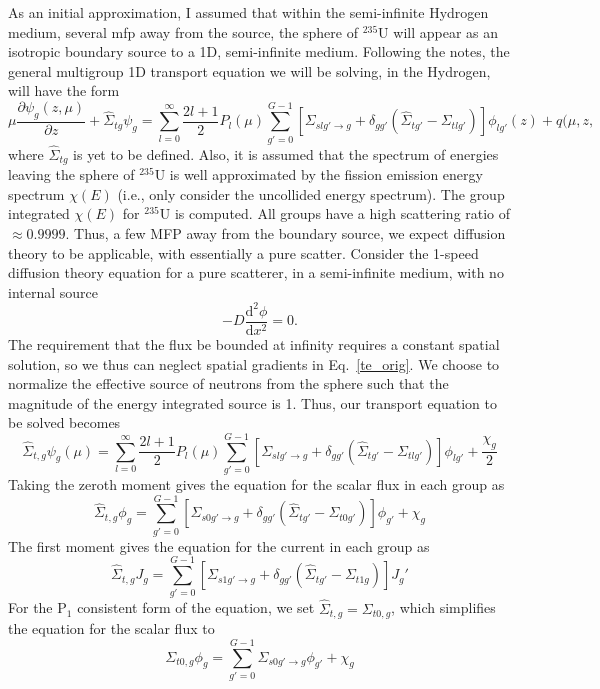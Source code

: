 \documentclass[12pt]{article}
\newcommand{\pderiv}[2]{\frac{\partial #1}{\partial #2}}
\renewcommand{\d}{\mathrm{d}}
\newcommand{\ra}{\rightarrow}
\newenvironment{solnum}[2][Solution]{\begin{trivlist}
\item[\hskip \labelsep {\bfseries #1}\hskip \labelsep {\bfseries #2:}]\hspace{0.3in}\newline\newline}{\end{trivlist}}
\newcommand{\iso}[2]{\ensuremath{^{#2}\text{#1}}}
\begin{document}
\begin{solnum}{2}
As an initial approximation, I assumed that within the semi-infinite Hydrogen medium, several
mfp away from the source, the sphere of \iso{U}{235} will appear as an isotropic
boundary source to a 1D, semi-infinite medium.  Following the notes, the general multigroup
1D transport equation we will be solving, in the Hydrogen, will have the form
\begin{equation}\label{te_orig}
    \mu\pderiv{\psi_g(z,\mu)}{z} +\hat\Sigma_{tg}\psi_g = \sum_{l=0}^\infty
    \frac{2l+1}{2} P_l(\mu) \sum_{g'=0}^{G-1}\left[\Sigma_{slg'\ra g} +
    \delta_{gg'}\left(\hat\Sigma_{tg'}-\Sigma_{tlg'}\right)\right]\phi_{lg'}(z) +
    q(\mu,z,
\end{equation}
where $\hat\Sigma_{tg}$ is yet to be defined.
Also, it is assumed that the spectrum of energies leaving the sphere of \iso{U}{235} is well
approximated by the fission emission energy spectrum $\chi(E)$ (i.e., only consider the
uncollided energy spectrum).  The group integrated $\chi(E)$ for \iso{U}{235} is
computed.  All groups have a high scattering ratio of $\approx0.9999$.  Thus, a
few MFP away from the boundary source, we expect diffusion theory to be applicable,
with essentially a pure scatter. Consider the 1-speed diffusion theory equation for a pure
scatterer, in a semi-infinite medium, with no internal source
\begin{equation}
    -D \frac{\d^2\phi}{\d x^2} = 0.
\end{equation}
The requirement that the flux be bounded at infinity requires a constant spatial
solution, so we thus can neglect spatial gradients in Eq.~\eqref{te_orig}.
We choose to normalize the effective source of neutrons from the sphere such that the
magnitude of the energy integrated source is 1.  Thus, our transport equation to be solved becomes
\begin{equation}
    \hat\Sigma_{t,g}\psi_g(\mu) = \sum_{l=0}^\infty
    \frac{2l+1}{2} P_l(\mu) \sum_{g'=0}^{G-1}\left[\Sigma_{slg'\ra g} +
    \delta_{gg'}\left(\hat\Sigma_{tg'}-\Sigma_{tlg'}\right)\right]\phi_{lg'} +
    \frac{\chi_g}{2}
\end{equation}
Taking the zeroth moment gives the equation for the scalar flux in each group as
\begin{equation}
    \hat\Sigma_{t,g}\phi_g = \sum_{g'=0}^{G-1}\left[\Sigma_{s0g'\ra g} +
    \delta_{gg'}\left(\hat\Sigma_{tg'}-\Sigma_{t0g'}\right)\right]\phi_{g'} +
    \chi_g
\end{equation}
The first moment gives the equation for the current in each group as
\begin{equation}
    \hat\Sigma_{t,g}J_g = \sum_{g'=0}^{G-1}\left[\Sigma_{s1g'\ra g} +
    \delta_{gg'}\left(\hat\Sigma_{tg'}-\Sigma_{t1g}\right)\right]J_g'
\end{equation}
For the P$_1$ consistent form of the equation, we set $\hat\Sigma_{t,g} =
\Sigma_{t0,g}$, which simplifies the equation for the scalar flux to
\begin{equation}
    \Sigma_{t0,g}\phi_g = \sum_{g'=0}^{G-1}\Sigma_{s0g'\ra g}\phi_{g'} +
    \chi_g
\end{equation}






\end{solnum}
\end{document}
